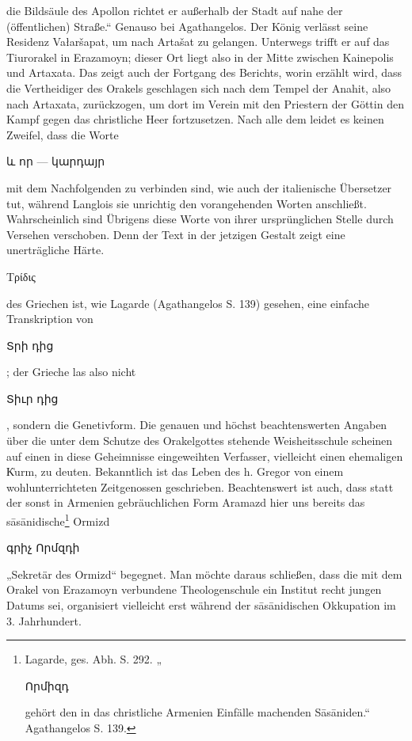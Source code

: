 \documentclass{article}
\begin{document}
die Bildsäule des Apollon richtet er außerhalb der Stadt auf nahe der (öffentlichen) Straße.“ Genauso bei Agathangelos. Der König verlässt seine Residenz Vałaršapat, um nach Artašat zu gelangen. Unterwegs trifft er auf das Tiurorakel in Erazamoyn; dieser Ort liegt also in der Mitte zwischen Kainepolis und Artaxata. Das zeigt auch der Fortgang des Berichts, worin erzählt wird, dass die Vertheidiger des Orakels geschlagen sich nach dem Tempel der Anahit, also nach Artaxata, zurückzogen, um dort im Verein mit den Priestern der Göttin den Kampf gegen das christliche Heer fortzusetzen. Nach alle dem leidet es keinen Zweifel, dass die Worte \begin{armenian}և որ — կարդայր\end{armenian} mit dem Nachfolgenden zu verbinden sind, wie auch der italienische Übersetzer tut, während Langlois sie unrichtig den vorangehenden Worten anschließt. Wahrscheinlich sind Übrigens diese Worte von ihrer ursprünglichen Stelle durch Versehen verschoben. Denn der Text in der jetzigen Gestalt zeigt eine unerträgliche Härte. \begin{greek}Τρίδις\end{greek} des Griechen ist, wie Lagarde (Agathangelos S. 139) gesehen, eine einfache Transkription von \begin{armenian}Տրի դից\end{armenian}; der Grieche las also nicht \begin{armenian}Տիւր դից\end{armenian}, sondern die Genetivform. Die genauen und höchst beachtenswerten Angaben über die unter dem Schutze des Orakelgottes stehende Weisheitsschule scheinen auf einen in diese Geheimnisse eingeweihten Verfasser, vielleicht einen ehemaligen K͑urm, zu deuten. Bekanntlich ist das Leben des h. Gregor von einem wohlunterrichteten Zeitgenossen geschrieben. Beachtenswert ist auch, dass statt der sonst in Armenien gebräuchlichen Form Aramazd hier uns bereits das sāsānidische\footnote{Lagarde, ges. Abh. S. 292. „\begin{armenian}Որմիզդ\end{armenian} gehört den in das christliche Armenien Einfälle machenden Sāsāniden.“ Agathangelos S. 139.} Ormizd \begin{armenian}գրիչ Որմզդի\end{armenian} „Sekretär des Ormizd“ begegnet. Man möchte daraus schließen, dass die mit dem Orakel von Erazamoyn verbundene Theologenschule ein Institut recht jungen Datums sei, organisiert vielleicht erst während der sāsānidischen Okkupation im 3. Jahrhundert.
\end{document}
